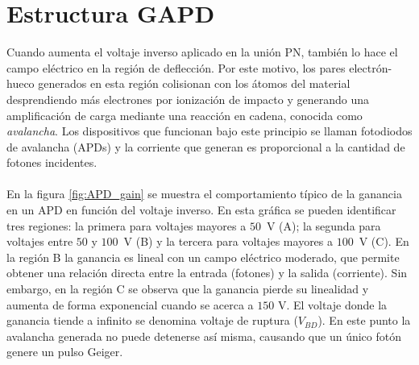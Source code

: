 \section{Estructura GAPD}
Cuando aumenta el voltaje inverso aplicado en la unión PN, también lo hace el campo eléctrico en la región de deflección. Por este motivo, los pares electrón-hueco generados en esta región colisionan con los átomos del material desprendiendo más electrones por ionización de impacto y generando una amplificación de carga mediante una reacción en cadena, conocida como \textit{avalancha}. Los dispositivos que funcionan bajo este principio se llaman fotodiodos de avalancha (APDs) y la corriente que generan es proporcional a la cantidad de fotones incidentes. \\ \\
En la figura \ref{fig:APD_gain} se muestra el comportamiento típico de la ganancia en un APD en función del voltaje inverso. En esta gráfica se pueden identificar tres regiones: la primera para voltajes mayores a $50$~V (A); la segunda para voltajes entre $50$ y $100$~V (B) y la tercera para voltajes mayores a $100$~V (C). En la región B la ganancia es lineal con un campo eléctrico moderado, que permite obtener una relación directa entre la entrada (fotones) y la salida (corriente). Sin embargo, en la región C se observa que la ganancia pierde su linealidad y aumenta de forma exponencial cuando se acerca a $150$ V. El voltaje  donde la ganancia tiende a infinito se denomina voltaje de ruptura ($V_{BD}$). En este punto la avalancha generada no puede detenerse así misma, causando que un único fotón genere un pulso Geiger.%
